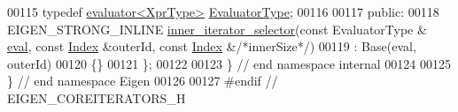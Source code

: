 \begin{DoxyCode}
00115   \textcolor{keyword}{typedef} \hyperlink{struct_eigen_1_1internal_1_1evaluator}{evaluator<XprType>} \hyperlink{struct_eigen_1_1internal_1_1evaluator}{EvaluatorType};
00116   
00117 \textcolor{keyword}{public}:
00118   EIGEN\_STRONG\_INLINE \hyperlink{class_eigen_1_1internal_1_1inner__iterator__selector}{inner\_iterator\_selector}(\textcolor{keyword}{const} EvaluatorType &
      \hyperlink{struct_eigen_1_1internal_1_1eval}{eval}, \textcolor{keyword}{const} \hyperlink{namespace_eigen_a62e77e0933482dafde8fe197d9a2cfde}{Index} &outerId, \textcolor{keyword}{const} \hyperlink{namespace_eigen_a62e77e0933482dafde8fe197d9a2cfde}{Index} &\textcolor{comment}{/*innerSize*/})
00119     : Base(eval, outerId)
00120   \{\}  
00121 \};
00122 
00123 \} \textcolor{comment}{// end namespace internal}
00124 
00125 \} \textcolor{comment}{// end namespace Eigen}
00126 
00127 \textcolor{preprocessor}{#endif // EIGEN\_COREITERATORS\_H}
\end{DoxyCode}
